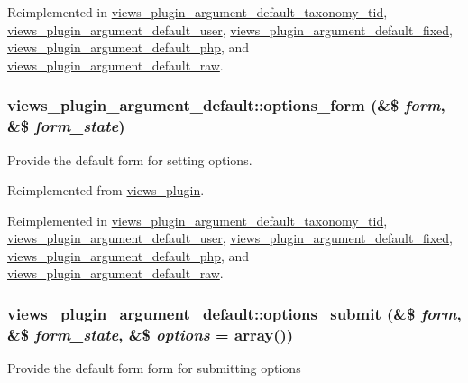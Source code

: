 Reimplemented in \hyperlink{classviews__plugin__argument__default__taxonomy__tid_acabe57c2f1f0dffd6775cc339bfb9d7e}{views\_\-plugin\_\-argument\_\-default\_\-taxonomy\_\-tid}, \hyperlink{classviews__plugin__argument__default__user_a7658c2ea175f9a2bf4c48e6e4a34fea8}{views\_\-plugin\_\-argument\_\-default\_\-user}, \hyperlink{classviews__plugin__argument__default__fixed_a6a0c87651155c020fc3b00c049db3add}{views\_\-plugin\_\-argument\_\-default\_\-fixed}, \hyperlink{classviews__plugin__argument__default__php_ab5a278f9c6318deee971fd12ef18b604}{views\_\-plugin\_\-argument\_\-default\_\-php}, and \hyperlink{classviews__plugin__argument__default__raw_a0301eba461bac2c3b80dde1978c476fe}{views\_\-plugin\_\-argument\_\-default\_\-raw}.\hypertarget{classviews__plugin__argument__default_a9bc59dae448f4c35d422bc54d0879930}{
\subsubsection[{options\_\-form}]{\setlength{\rightskip}{0pt plus 5cm}views\_\-plugin\_\-argument\_\-default::options\_\-form (\&\$ {\em form}, \/  \&\$ {\em form\_\-state})}}
\label{classviews__plugin__argument__default_a9bc59dae448f4c35d422bc54d0879930}
Provide the default form for setting options. 

Reimplemented from \hyperlink{classviews__plugin_a1aaed8da1afd9f45293a37358c159837}{views\_\-plugin}.

Reimplemented in \hyperlink{classviews__plugin__argument__default__taxonomy__tid_a4039b38be3fb7c9702548abaae587b74}{views\_\-plugin\_\-argument\_\-default\_\-taxonomy\_\-tid}, \hyperlink{classviews__plugin__argument__default__user_aa034a957fc75daf289368c429a26e10e}{views\_\-plugin\_\-argument\_\-default\_\-user}, \hyperlink{classviews__plugin__argument__default__fixed_a77c335bd34999e6e241193dbc25f6a8c}{views\_\-plugin\_\-argument\_\-default\_\-fixed}, \hyperlink{classviews__plugin__argument__default__php_adfe529cfc20d02c8e2de13451dfa7071}{views\_\-plugin\_\-argument\_\-default\_\-php}, and \hyperlink{classviews__plugin__argument__default__raw_a59d56d66b37523fc25b7a83f097c4f76}{views\_\-plugin\_\-argument\_\-default\_\-raw}.\hypertarget{classviews__plugin__argument__default_af4ea60d1be178072a6cf37feb582222c}{
\subsubsection[{options\_\-submit}]{\setlength{\rightskip}{0pt plus 5cm}views\_\-plugin\_\-argument\_\-default::options\_\-submit (\&\$ {\em form}, \/  \&\$ {\em form\_\-state}, \/  \&\$ {\em options} = {\ttfamily array()})}}
\label{classviews__plugin__argument__default_af4ea60d1be178072a6cf37feb582222c}
Provide the default form form for submitting options 

